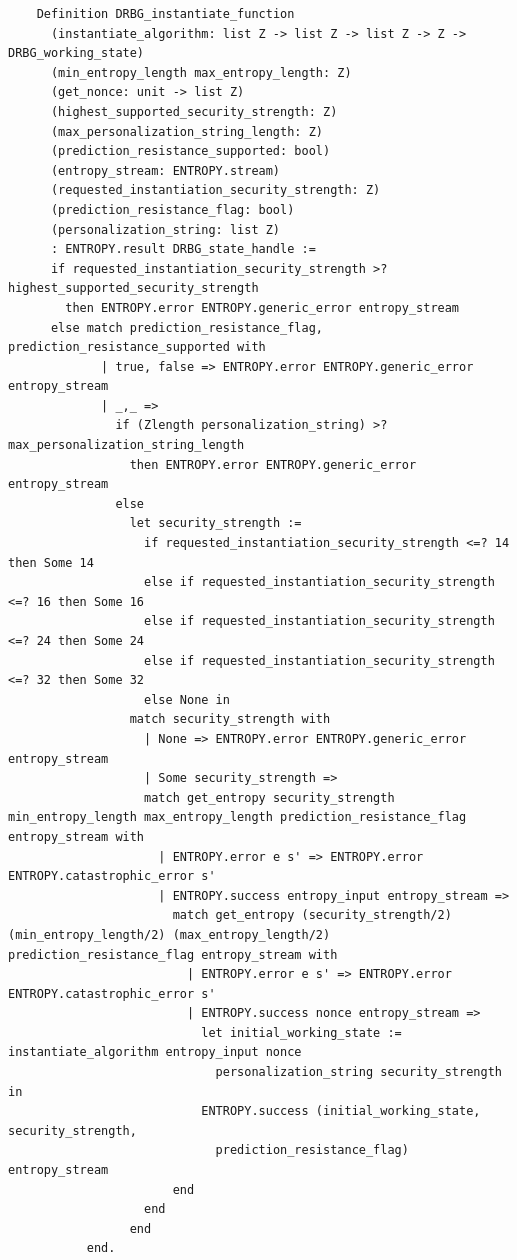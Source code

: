 \documentclass[pageno]{jpaper}
\begin{document}
\begin{lstlisting}
    Definition DRBG_instantiate_function
      (instantiate_algorithm: list Z -> list Z -> list Z -> Z -> DRBG_working_state)
      (min_entropy_length max_entropy_length: Z)
      (get_nonce: unit -> list Z)
      (highest_supported_security_strength: Z)
      (max_personalization_string_length: Z)
      (prediction_resistance_supported: bool)
      (entropy_stream: ENTROPY.stream)
      (requested_instantiation_security_strength: Z)
      (prediction_resistance_flag: bool)
      (personalization_string: list Z)
      : ENTROPY.result DRBG_state_handle :=
      if requested_instantiation_security_strength >? highest_supported_security_strength
        then ENTROPY.error ENTROPY.generic_error entropy_stream
      else match prediction_resistance_flag, prediction_resistance_supported with
             | true, false => ENTROPY.error ENTROPY.generic_error entropy_stream
             | _,_ =>
               if (Zlength personalization_string) >? max_personalization_string_length
                 then ENTROPY.error ENTROPY.generic_error entropy_stream
               else
                 let security_strength :=
                   if requested_instantiation_security_strength <=? 14 then Some 14
                   else if requested_instantiation_security_strength <=? 16 then Some 16
                   else if requested_instantiation_security_strength <=? 24 then Some 24
                   else if requested_instantiation_security_strength <=? 32 then Some 32
                   else None in
                 match security_strength with
                   | None => ENTROPY.error ENTROPY.generic_error entropy_stream
                   | Some security_strength =>
                   match get_entropy security_strength min_entropy_length max_entropy_length prediction_resistance_flag entropy_stream with
                     | ENTROPY.error e s' => ENTROPY.error ENTROPY.catastrophic_error s'
                     | ENTROPY.success entropy_input entropy_stream =>
                       match get_entropy (security_strength/2) (min_entropy_length/2) (max_entropy_length/2) prediction_resistance_flag entropy_stream with
                         | ENTROPY.error e s' => ENTROPY.error ENTROPY.catastrophic_error s'
                         | ENTROPY.success nonce entropy_stream =>
                           let initial_working_state := instantiate_algorithm entropy_input nonce
                             personalization_string security_strength in
                           ENTROPY.success (initial_working_state, security_strength,
                             prediction_resistance_flag) entropy_stream
                       end
                   end
                 end
           end.
\end{lstlisting}
\end{document}
